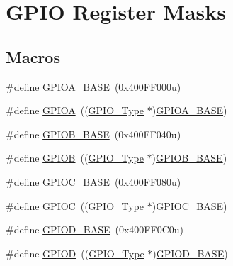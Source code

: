 \hypertarget{group___g_p_i_o___register___masks}{}\section{G\+P\+IO Register Masks}
\label{group___g_p_i_o___register___masks}
\subsection*{Macros}
\begin{DoxyCompactItemize}
\item 
\#define \mbox{\hyperlink{group___g_p_i_o___register___masks_gad7723846cc5db8e43a44d78cf21f6efa}{G\+P\+I\+O\+A\+\_\+\+B\+A\+SE}}~(0x400\+F\+F000u)
\item 
\#define \mbox{\hyperlink{group___g_p_i_o___register___masks_gac485358099728ddae050db37924dd6b7}{G\+P\+I\+OA}}~((\mbox{\hyperlink{struct_g_p_i_o___type}{G\+P\+I\+O\+\_\+\+Type}} $\ast$)\mbox{\hyperlink{group___g_p_i_o___register___masks_gad7723846cc5db8e43a44d78cf21f6efa}{G\+P\+I\+O\+A\+\_\+\+B\+A\+SE}})
\item 
\#define \mbox{\hyperlink{group___g_p_i_o___register___masks_gac944a89eb789000ece920c0f89cb6a68}{G\+P\+I\+O\+B\+\_\+\+B\+A\+SE}}~(0x400\+F\+F040u)
\item 
\#define \mbox{\hyperlink{group___g_p_i_o___register___masks_ga68b66ac73be4c836db878a42e1fea3cd}{G\+P\+I\+OB}}~((\mbox{\hyperlink{struct_g_p_i_o___type}{G\+P\+I\+O\+\_\+\+Type}} $\ast$)\mbox{\hyperlink{group___g_p_i_o___register___masks_gac944a89eb789000ece920c0f89cb6a68}{G\+P\+I\+O\+B\+\_\+\+B\+A\+SE}})
\item 
\#define \mbox{\hyperlink{group___g_p_i_o___register___masks_ga26f267dc35338eef219544c51f1e6b3f}{G\+P\+I\+O\+C\+\_\+\+B\+A\+SE}}~(0x400\+F\+F080u)
\item 
\#define \mbox{\hyperlink{group___g_p_i_o___register___masks_ga2dca03332d620196ba943bc2346eaa08}{G\+P\+I\+OC}}~((\mbox{\hyperlink{struct_g_p_i_o___type}{G\+P\+I\+O\+\_\+\+Type}} $\ast$)\mbox{\hyperlink{group___g_p_i_o___register___masks_ga26f267dc35338eef219544c51f1e6b3f}{G\+P\+I\+O\+C\+\_\+\+B\+A\+SE}})
\item 
\#define \mbox{\hyperlink{group___g_p_i_o___register___masks_ga1a93ab27129f04064089616910c296ec}{G\+P\+I\+O\+D\+\_\+\+B\+A\+SE}}~(0x400\+F\+F0\+C0u)
\item 
\#define \mbox{\hyperlink{group___g_p_i_o___register___masks_ga7580b1a929ea9df59725ba9c18eba6ac}{G\+P\+I\+OD}}~((\mbox{\hyperlink{struct_g_p_i_o___type}{G\+P\+I\+O\+\_\+\+Type}} $\ast$)\mbox{\hyperlink{group___g_p_i_o___register___masks_ga1a93ab27129f04064089616910c296ec}{G\+P\+I\+O\+D\+\_\+\+B\+A\+SE}})

\end{DoxyCompactItemize}
